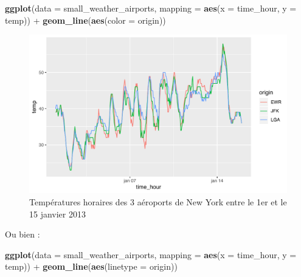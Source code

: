 \documentclass[a4paperpaper,]{article}
\newenvironment{Shaded}{\begin{snugshade}}{\end{snugshade}}
\newcommand{\DataTypeTok}[1]{\textcolor[rgb]{0.00,0.34,0.68}{#1}}
\newcommand{\KeywordTok}[1]{\textcolor[rgb]{0.12,0.11,0.11}{\textbf{#1}}}
\newcommand{\NormalTok}[1]{\textcolor[rgb]{0.12,0.11,0.11}{#1}}
\newcommand{\OperatorTok}[1]{\textcolor[rgb]{0.12,0.11,0.11}{#1}}
\newcommand{\StringTok}[1]{\textcolor[rgb]{0.75,0.01,0.01}{#1}}
\theoremstyle{definition}
\theoremstyle{definition}
\theoremstyle{definition}
\theoremstyle{remark}
\begin{document}
\begin{Shaded}
\begin{Highlighting}[]
\KeywordTok{ggplot}\NormalTok{(}\DataTypeTok{data =}\NormalTok{ small_weather_airports, }\DataTypeTok{mapping =} \KeywordTok{aes}\NormalTok{(}\DataTypeTok{x =}\NormalTok{ time_hour, }\DataTypeTok{y =}\NormalTok{ temp)) }\OperatorTok{+}
\StringTok{  }\KeywordTok{geom_line}\NormalTok{(}\KeywordTok{aes}\NormalTok{(}\DataTypeTok{color =}\NormalTok{ origin))}
\end{Highlighting}
\end{Shaded}

\begin{figure}[htpb]

{\centering \includegraphics[width=0.9\linewidth]{figure/linecolor-1} 

}

\caption{Températures horaires des 3 aéroports de New York entre le 1er et le 15 janvier 2013}\label{fig:linecolor}
\end{figure}

Ou bien :

\begin{Shaded}
\begin{Highlighting}[]
\KeywordTok{ggplot}\NormalTok{(}\DataTypeTok{data =}\NormalTok{ small_weather_airports, }\DataTypeTok{mapping =} \KeywordTok{aes}\NormalTok{(}\DataTypeTok{x =}\NormalTok{ time_hour, }\DataTypeTok{y =}\NormalTok{ temp)) }\OperatorTok{+}
\StringTok{  }\KeywordTok{geom_line}\NormalTok{(}\KeywordTok{aes}\NormalTok{(}\DataTypeTok{linetype =}\NormalTok{ origin))}
\end{Highlighting}
\end{Shaded}
\end{document}
